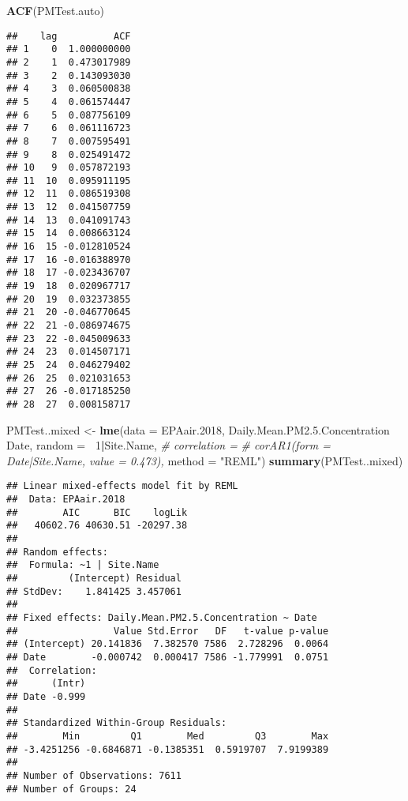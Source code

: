 \documentclass[]{article}
\newenvironment{Shaded}{\begin{snugshade}}{\end{snugshade}}
\newcommand{\KeywordTok}[1]{\textcolor[rgb]{0.13,0.29,0.53}{\textbf{#1}}}
\newcommand{\DataTypeTok}[1]{\textcolor[rgb]{0.13,0.29,0.53}{#1}}
\newcommand{\DecValTok}[1]{\textcolor[rgb]{0.00,0.00,0.81}{#1}}
\newcommand{\FloatTok}[1]{\textcolor[rgb]{0.00,0.00,0.81}{#1}}
\newcommand{\StringTok}[1]{\textcolor[rgb]{0.31,0.60,0.02}{#1}}
\newcommand{\CommentTok}[1]{\textcolor[rgb]{0.56,0.35,0.01}{\textit{#1}}}
\newcommand{\OperatorTok}[1]{\textcolor[rgb]{0.81,0.36,0.00}{\textbf{#1}}}
\newcommand{\NormalTok}[1]{#1}
\begin{document}
\begin{Shaded}
\begin{Highlighting}[]
\KeywordTok{ACF}\NormalTok{(PMTest.auto)}
\end{Highlighting}
\end{Shaded}

\begin{verbatim}
##    lag          ACF
## 1    0  1.000000000
## 2    1  0.473017989
## 3    2  0.143093030
## 4    3  0.060500838
## 5    4  0.061574447
## 6    5  0.087756109
## 7    6  0.061116723
## 8    7  0.007595491
## 9    8  0.025491472
## 10   9  0.057872193
## 11  10  0.095911195
## 12  11  0.086519308
## 13  12  0.041507759
## 14  13  0.041091743
## 15  14  0.008663124
## 16  15 -0.012810524
## 17  16 -0.016388970
## 18  17 -0.023436707
## 19  18  0.020967717
## 20  19  0.032373855
## 21  20 -0.046770645
## 22  21 -0.086974675
## 23  22 -0.045009633
## 24  23  0.014507171
## 25  24  0.046279402
## 26  25  0.021031653
## 27  26 -0.017185250
## 28  27  0.008158717
\end{verbatim}

\begin{Shaded}
\begin{Highlighting}[]
\NormalTok{PMTest..mixed <-}\StringTok{ }\KeywordTok{lme}\NormalTok{(}\DataTypeTok{data =}\NormalTok{ EPAair.}\DecValTok{2018}\NormalTok{,}
\NormalTok{                     Daily.Mean.PM2.}\FloatTok{5.}\NormalTok{Concentration }\OperatorTok{~}\StringTok{ }\NormalTok{Date, }
                     \DataTypeTok{random =} \OperatorTok{~}\DecValTok{1}\OperatorTok{|}\NormalTok{Site.Name, }
\CommentTok{#                     correlation = }
\CommentTok{#                     corAR1(form = ~ Date|Site.Name, value = 0.473),  }
                     \DataTypeTok{method =} \StringTok{"REML"}\NormalTok{)}
\KeywordTok{summary}\NormalTok{(PMTest..mixed)}
\end{Highlighting}
\end{Shaded}

\begin{verbatim}
## Linear mixed-effects model fit by REML
##  Data: EPAair.2018 
##        AIC      BIC    logLik
##   40602.76 40630.51 -20297.38
## 
## Random effects:
##  Formula: ~1 | Site.Name
##         (Intercept) Residual
## StdDev:    1.841425 3.457061
## 
## Fixed effects: Daily.Mean.PM2.5.Concentration ~ Date 
##                 Value Std.Error   DF   t-value p-value
## (Intercept) 20.141836  7.382570 7586  2.728296  0.0064
## Date        -0.000742  0.000417 7586 -1.779991  0.0751
##  Correlation: 
##      (Intr)
## Date -0.999
## 
## Standardized Within-Group Residuals:
##        Min         Q1        Med         Q3        Max 
## -3.4251256 -0.6846871 -0.1385351  0.5919707  7.9199389 
## 
## Number of Observations: 7611
## Number of Groups: 24
\end{verbatim}
\end{document}
